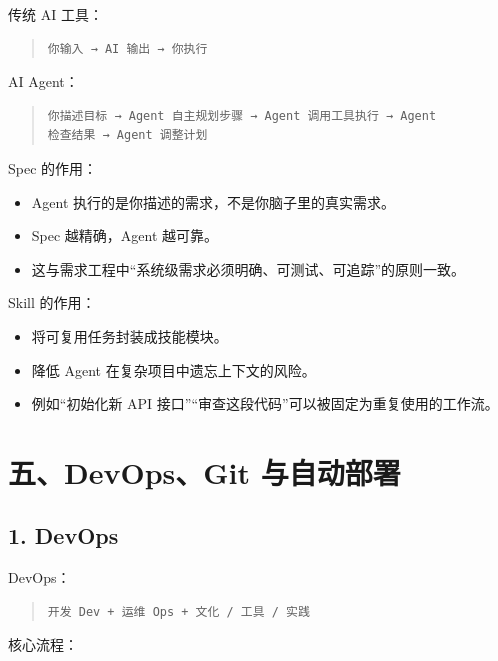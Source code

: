 \documentclass[UTF8,zihao=-4]{ctexart}
\begin{document}
传统 AI 工具：

\begin{quote}
\footnotesize
\begin{verbatim}
你输入 → AI 输出 → 你执行
\end{verbatim}
\end{quote}

AI Agent：

\begin{quote}
\footnotesize
\begin{verbatim}
你描述目标 → Agent 自主规划步骤 → Agent 调用工具执行 → Agent 
检查结果 → Agent 调整计划
\end{verbatim}
\end{quote}

Spec 的作用：

\begin{itemize}
\item Agent 执行的是你描述的需求，不是你脑子里的真实需求。
\item Spec 越精确，Agent 越可靠。
\item 这与需求工程中“系统级需求必须明确、可测试、可追踪”的原则一致。
\end{itemize}

Skill 的作用：

\begin{itemize}
\item 将可复用任务封装成技能模块。
\item 降低 Agent 在复杂项目中遗忘上下文的风险。
\item 例如“初始化新 API 接口”“审查这段代码”可以被固定为重复使用的工作流。
\end{itemize}

\section{五、DevOps、Git 与自动部署}

\subsection{1. DevOps}

DevOps：

\begin{quote}
\footnotesize
\begin{verbatim}
开发 Dev + 运维 Ops + 文化 / 工具 / 实践
\end{verbatim}
\end{quote}

核心流程：
\end{document}
